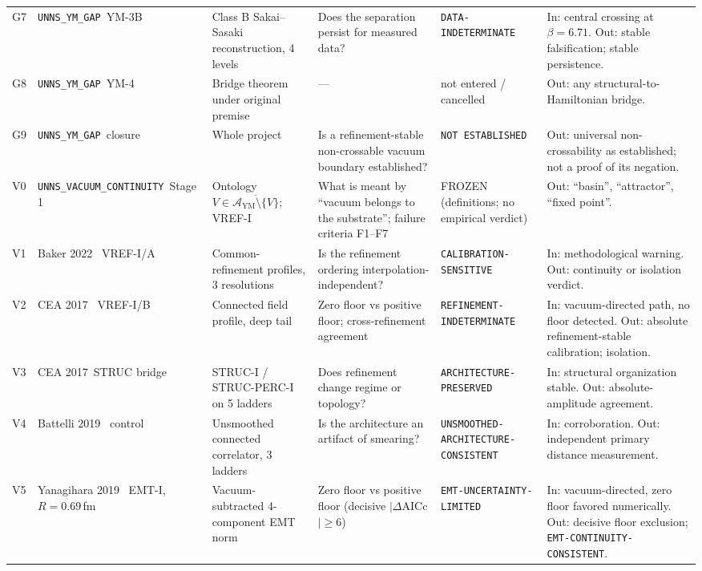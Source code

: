 \documentclass[11pt,a4paper]{article}
\theoremstyle{definition}
\theoremstyle{remark}
\newcommand{\AYM}{\mathcal{A}_{\mathrm{YM}}}
\begin{document}
\begin{landscape}
{\begin{longtable}{@{}l>{\raggedright\arraybackslash}p{3.3cm}>{\raggedright\arraybackslash}p{3.8cm}>{\raggedright\arraybackslash}p{4.4cm}>{\raggedright\arraybackslash}p{4.6cm}>{\raggedright\arraybackslash}p{5.2cm}@{}}
G7 & \texttt{UNNS\_YM\_GAP}\ YM-3B & Class B Sakai--Sasaki reconstruction, 4 levels & Does the separation persist for measured data? & \texttt{DATA-\allowbreak{}INDETERMINATE} & In: central crossing at $\beta=6.71$. Out: stable falsification; stable persistence.\\[3pt]
G8 & \texttt{UNNS\_YM\_GAP}\ YM-4 & Bridge theorem under original premise & --- & not entered / cancelled & Out: any structural-to-Hamiltonian bridge.\\[3pt]
G9 & \texttt{UNNS\_YM\_GAP}\ closure & Whole project & Is a refinement-stable non-crossable vacuum boundary established? & \texttt{NOT ESTABLISHED} & Out: universal non-crossability as established; not a proof of its negation.\\[3pt]
\midrule
V0 & \texttt{UNNS\_VACUUM\_\allowbreak CONTINUITY}\ Stage 1 & Ontology $V\in\overline{\AYM\setminus\{V\}}$; VREF-I & What is meant by ``vacuum belongs to the substrate\textquotedblright{}; failure criteria F1--F7 & FROZEN (definitions; no empirical verdict) & Out: ``basin\textquotedblright{}, ``attractor\textquotedblright{}, ``fixed point\textquotedblright{}.\\[3pt]
\midrule
V1 & Baker 2022 \cite{Baker22}\ VREF-I/A & Common-refinement profiles, 3 resolutions & Is the refinement ordering interpolation-independent? & \texttt{CALIBRATION-\allowbreak{}SENSITIVE} & In: methodological warning. Out: continuity or isolation verdict.\\[3pt]
V2 & CEA 2017 \cite{Cea17}\ VREF-I/B & Connected field profile, deep tail & Zero floor vs positive floor; cross-refinement agreement & \texttt{REFINEMENT-\allowbreak{}INDETERMINATE} & In: vacuum-directed path, no floor detected. Out: absolute refinement-stable calibration; isolation.\\[3pt]
V3 & CEA 2017\ STRUC bridge & STRUC-I / STRUC-PERC-I on 5 ladders & Does refinement change regime or topology? & \texttt{ARCHITECTURE-\allowbreak{}PRESERVED} & In: structural organization stable. Out: absolute-amplitude agreement.\\[3pt]
V4 & Battelli 2019 \cite{Battelli19}\ control & Unsmoothed connected correlator, 3 ladders & Is the architecture an artifact of smearing? & \texttt{UNSMOOTHED-\allowbreak{}ARCHITECTURE-\allowbreak{}CONSISTENT} & In: corroboration. Out: independent primary distance measurement.\\[3pt]
V5 & Yanagihara 2019 \cite{Yanagihara19}\ EMT-I, $R=0.69$\,fm & Vacuum-subtracted 4-component EMT norm & Zero floor vs positive floor (decisive $|\Delta$AICc$|\ge6$) & \texttt{EMT-\allowbreak{}UNCERTAINTY-\allowbreak{}LIMITED} & In: vacuum-directed, zero floor favored numerically. Out: decisive floor exclusion; \texttt{EMT-\allowbreak{}CONTINUITY-\allowbreak{}CONSISTENT}.\\[3pt]

\end{longtable}}
\end{landscape}
\end{document}
